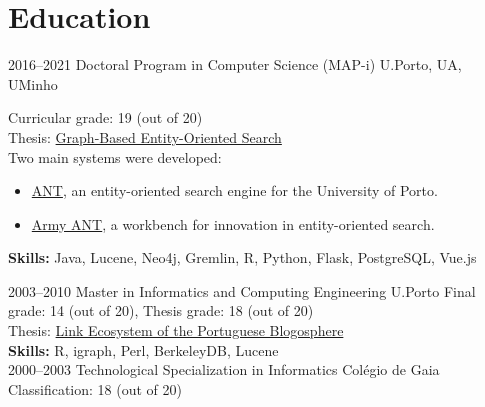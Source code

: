 \documentclass{friggeri-cv}
\begin{document}

\section{Education}

\begin{entrylist}
\entry
{2016--2021}
{Doctoral Program {\normalfont in Computer Science (MAP-i)}}
{U.Porto, UA, UMinho}
{Curricular grade: 19 {\footnotesize (out of 20)}\\
Thesis: \href{http://josedevezas.com/pdf/academy/publications/theses/phd_thesis-2021-devezas-graph_based_entity_oriented_search.pdf}{Graph-Based Entity-Oriented Search}\\[-.5em]

Two main systems were developed:\\[-.5em]

\begin{itemize}[leftmargin=*]
  \item \href{https://ant.fe.up.pt/}{ANT}, an entity-oriented search engine for the University of Porto.
  \item \href{https://youtube.com/playlist?list=PLc6NtbG0dqo1wGoYdTZkVd7I4SFNodKot}{Army ANT}, a workbench for innovation in entity-oriented search.
\end{itemize}

\vspace{1em}

{\small \textbf{Skills:} Java, Lucene, Neo4j, Gremlin, R, Python, Flask, \mbox{PostgreSQL}, Vue.js}\\}
\entry
{2003--2010}
{Master {\normalfont in Informatics and Computing Engineering}}
{U.Porto}
{Final grade: 14 {\footnotesize (out of 20)}, Thesis grade: 18 {\footnotesize (out of 20)}\\
Thesis: \href{http://josedevezas.com/pdf/academy/publications/theses/masters_thesis-2010-devezas-link_ecosystem_of_the_portuguese_blogosphere.pdf}{Link Ecosystem of the Portuguese Blogosphere}\\[-.5em]

{\small \textbf{Skills:} R, igraph, Perl, BerkeleyDB, Lucene}\\}
\entry
{2000--2003}
{Technological Specialization {\normalfont in Informatics}}
{Colégio de Gaia}
{Classification: 18 {\footnotesize (out of 20)}}
\end{entrylist}
\end{document}

